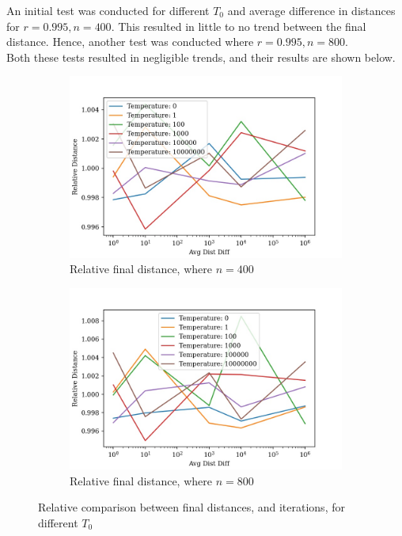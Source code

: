 \documentclass{article}
\begin{document}
An initial test was conducted for different $T_0$ and average difference in distances for $r = 0.995, n = 400$.
This resulted in little to no trend between the final distance.
Hence, another test was conducted where $r = 0.995, n = 800$.
\\

Both these tests resulted in negligible trends, and their results are shown below.

\begin{figure}[H]
    \centering
    \begin{subfigure}{0.45\textwidth}
        \centering
        \includegraphics[width=1\linewidth]{images/rand_temperature_avg_dist_diff_distance_relative_400.jpg}
        \caption{Relative final distance, where $n = 400$}
    \end{subfigure}%
    \begin{subfigure}{0.45\textwidth}
        \centering
        \includegraphics[width=1\linewidth]{images/rand_temperature_avg_dist_diff_distance_relative_800.jpg}
        \caption{Relative final distance, where $n = 800$}
    \end{subfigure}
    \captionsetup{justification=centering}
    \caption{Relative comparison between final distances, and iterations, for different $T_0$}
\end{figure}
\end{document}
